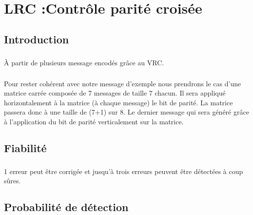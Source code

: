 
\chapter{LRC :Contrôle parité croisée}

    \section{Introduction}

        \paragraph{}
À partir de plusieurs message encodés grâce au VRC.
        \paragraph{}
Pour rester cohérent avec notre message d'exemple nous prendrons le cas d'une matrice carrée composée de 7 messages de taille 7 chacun.
Il sera appliqué horizontalement à la matrice (à chaque message) le bit de parité.
La matrice passera donc à une taille de (7+1) sur 8.
Le dernier message qui sera généré grâce à l'application du bit de parité verticalement sur la matrice.


    \clearpage

    \section{Fiabilité}

        \paragraph{}
1 erreur peut être corrigée et jusqu’à trois erreurs peuvent être détectées à coup sûres.


    \section{Probabilité de détection}

